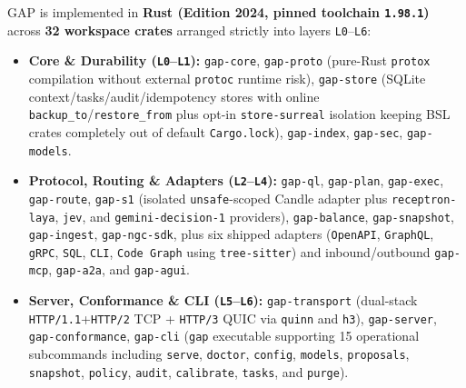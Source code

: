 \documentclass[10pt,twocolumn]{article}
\begin{document}
GAP is implemented in \textbf{Rust (Edition 2024, pinned toolchain \texttt{1.98.1})} across \textbf{32 workspace crates} arranged strictly into layers \texttt{L0}--\texttt{L6}:
\begin{itemize}
  \item \textbf{Core \& Durability (\texttt{L0}--\texttt{L1}):} \texttt{gap-core}, \texttt{gap-proto} (pure-Rust \texttt{protox} compilation without external \texttt{protoc} runtime risk), \texttt{gap-store} (SQLite context/tasks/audit/idempotency stores with online \texttt{backup\_to}/\texttt{restore\_from} plus opt-in \texttt{store-surreal} isolation keeping BSL crates completely out of default \texttt{Cargo.lock}), \texttt{gap-index}, \texttt{gap-sec}, \texttt{gap-models}.
  \item \textbf{Protocol, Routing \& Adapters (\texttt{L2}--\texttt{L4}):} \texttt{gap-ql}, \texttt{gap-plan}, \texttt{gap-exec}, \texttt{gap-route}, \texttt{gap-s1} (isolated \texttt{unsafe}-scoped Candle adapter plus \texttt{receptron-laya}, \texttt{jev}, and \texttt{gemini-decision-1} providers), \texttt{gap-balance}, \texttt{gap-snapshot}, \texttt{gap-ingest}, \texttt{gap-ngc-sdk}, plus six shipped adapters (\texttt{OpenAPI}, \texttt{GraphQL}, \texttt{gRPC}, \texttt{SQL}, \texttt{CLI}, \texttt{Code Graph} using \texttt{tree-sitter}) and inbound/outbound \texttt{gap-mcp}, \texttt{gap-a2a}, and \texttt{gap-agui}.
  \item \textbf{Server, Conformance \& CLI (\texttt{L5}--\texttt{L6}):} \texttt{gap-transport} (dual-stack \texttt{HTTP/1.1}+\texttt{HTTP/2} TCP + \texttt{HTTP/3} QUIC via \texttt{quinn} and \texttt{h3}), \texttt{gap-server}, \texttt{gap-conformance}, \texttt{gap-cli} (\texttt{gap} executable supporting 15 operational subcommands including \texttt{serve}, \texttt{doctor}, \texttt{config}, \texttt{models}, \texttt{proposals}, \texttt{snapshot}, \texttt{policy}, \texttt{audit}, \texttt{calibrate}, \texttt{tasks}, and \texttt{purge}).
\end{itemize}
\end{document}
